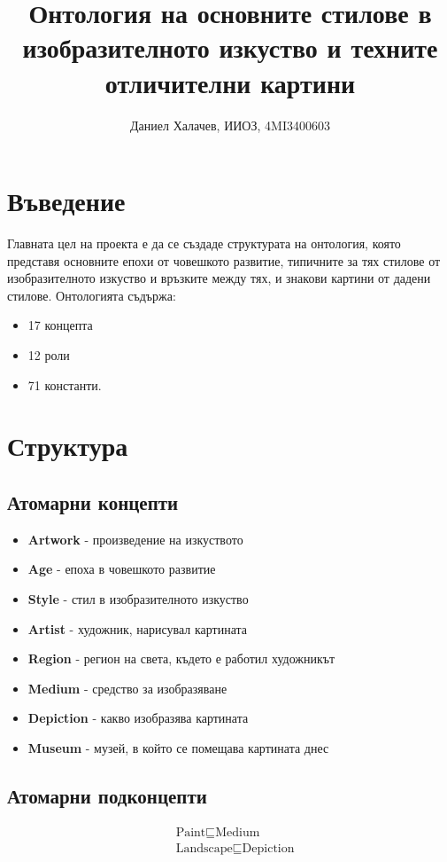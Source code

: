 \documentclass[a4paper, 11pt]{article}
\begin{document}
\author{Даниел Халачев, ИИОЗ, 4MI3400603}
\title{Онтология на основните стилове в изобразителното изкуство и техните отличителни картини}
\maketitle

\pagebreak
\tableofcontents
\pagebreak
\section{Въведение}
Главната цел на проекта е да се създаде структурата на онтология, която представя основните епохи от човешкото развитие, типичните за тях стилове от изобразителното изкуство и връзките между тях, и знакови картини от дадени стилове. Онтологията съдържа:
\begin{itemize}
  \item 17 концепта
  \item 12 роли
  \item 71 константи.
\end{itemize}
\section{Структура}
\subsection{Атомарни концепти}
\begin{itemize}
  \item \textbf{Artwork} - произведение на изкуството
  \item \textbf{Age} - епоха в човешкото развитие
  \item \textbf{Style} - стил в изобразителното изкуство
  \item \textbf{Artist} - художник, нарисувал картината
  \item \textbf{Region} - регион на света, където е работил художникът
  \item \textbf{Medium} - средство за изобразяване
  \item \textbf{Depiction} - какво изобразява картината
  \item \textbf{Museum} - музей, в който се помещава картината днес
\end{itemize}
\subsection{Атомарни подконцепти}
\begin{align*}
  &\text{Paint} \sqsubseteq \text{Medium} \\
  &\text{Landscape} \sqsubseteq \text{Depiction}
\end{align*}
\end{document}
